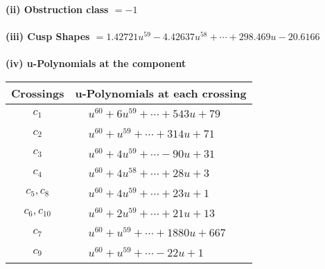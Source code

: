 \documentclass[1p]{elsarticle_modified}
\theoremstyle{definition}
\begin{document}
\flushleft \textbf{(ii) Obstruction class $= -1$}\\~\\
\flushleft \textbf{(iii) Cusp Shapes $= 1.42721 u^{59}-4.42637 u^{58}+\cdots+298.469 u-20.6166$}\\~\\
\newpage\renewcommand{\arraystretch}{1}
\flushleft \textbf{(iv) u-Polynomials at the component}\newline \\
\begin{tabular}{m{50pt}|m{274pt}}
Crossings & \hspace{64pt}u-Polynomials at each crossing \\
\hline $$\begin{aligned}c_{1}\end{aligned}$$&$\begin{aligned}
&u^{60}+6 u^{59}+\cdots+543 u+79
\end{aligned}$\\
\hline $$\begin{aligned}c_{2}\end{aligned}$$&$\begin{aligned}
&u^{60}+u^{59}+\cdots+314 u+71
\end{aligned}$\\
\hline $$\begin{aligned}c_{3}\end{aligned}$$&$\begin{aligned}
&u^{60}+4 u^{59}+\cdots-90 u+31
\end{aligned}$\\
\hline $$\begin{aligned}c_{4}\end{aligned}$$&$\begin{aligned}
&u^{60}+4 u^{58}+\cdots+28 u+3
\end{aligned}$\\
\hline $$\begin{aligned}c_{5},c_{8}\end{aligned}$$&$\begin{aligned}
&u^{60}+4 u^{59}+\cdots+23 u+1
\end{aligned}$\\
\hline $$\begin{aligned}c_{6},c_{10}\end{aligned}$$&$\begin{aligned}
&u^{60}+2 u^{59}+\cdots+21 u+13
\end{aligned}$\\
\hline $$\begin{aligned}c_{7}\end{aligned}$$&$\begin{aligned}
&u^{60}+u^{59}+\cdots+1880 u+667
\end{aligned}$\\
\hline $$\begin{aligned}c_{9}\end{aligned}$$&$\begin{aligned}
&u^{60}+u^{59}+\cdots-22 u+1
\end{aligned}$\\
\hline
\end{tabular}\\~\\
\end{document}
